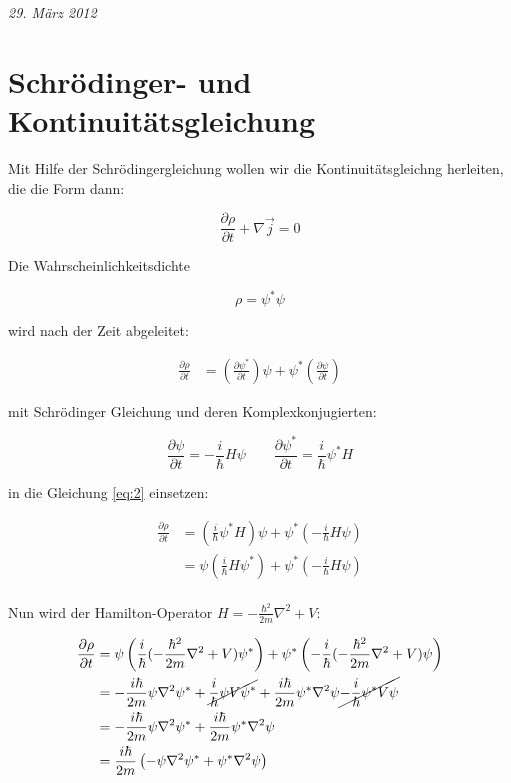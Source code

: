



\textit{29. März 2012}


\section*{Schrödinger- und Kontinuitätsgleichung}

Mit Hilfe der Schrödingergleichung wollen wir die Kontinuitätsgleichng herleiten, die die Form dann:

\begin{equation}
  \label{eq:1}
  \frac{\partial \rho}{\partial t} + \nabla \vec j = 0
\end{equation}

Die Wahrscheinlichkeitsdichte 

\[ \rho = \psi^*\psi \]

wird nach der Zeit abgeleitet:

\begin{align}
\frac{\partial \rho}{\partial t} &= \left(\frac{\partial \psi^*}{\partial t}\right)\psi + \psi^*\left(\frac{\partial \psi}{\partial t}\right) \label{eq:2}
\end{align}

mit Schrödinger Gleichung und deren Komplexkonjugierten:

\[ \frac{\partial \psi}{\partial t} = -\frac{i}{\hbar}H\psi \qquad \frac{\partial \psi^*}{\partial t} = \frac{i}{\hbar}\psi^* H   \]

in die Gleichung \eqref{eq:2} einsetzen:

\begin{align}
\frac{\partial \rho}{\partial t} &= \left( \frac{i}{\hbar}\psi^* H  \right)\psi + \psi^*\left( -\frac{i}{\hbar}H\psi \right)\\
&= \psi \left( \frac{i}{\hbar}H\psi^*  \right) + \psi^*\left( -\frac{i}{\hbar}H\psi \right)\\
\end{align}

Nun wird der Hamilton-Operator \( H = -\frac{\hbar^2}{2m}\nabla^2 + V\):

\begin{align}
\frac{\partial \rho}{\partial t} &= \psi \left( \frac{i}{\hbar}( -\frac{\hbar^2}{2m}\nabla^2 + V ) \psi^* \right) + \psi^*\left( -\frac{i}{\hbar}(-\frac{\hbar^2}{2m}\nabla^2 + V  )\psi \right)\\
&=  - \frac{i\hbar}{2m} \psi \nabla^2\psi^* +\cancel{ \frac{i}{\hbar}\psi V \psi^*} + \frac{i\hbar}{2m} \psi^* \nabla^2\psi \cancel{- \frac{i}{\hbar}\psi^* V\psi} \\
&=  - \frac{i\hbar}{2m} \psi \nabla^2\psi^* + \frac{i\hbar}{2m} \psi^* \nabla^2\psi\\
&= \frac{i\hbar}{2m} \left(-\psi \nabla^2\psi^* + \psi^* \nabla^2\psi\right) \label{eq:4}
\end{align}

